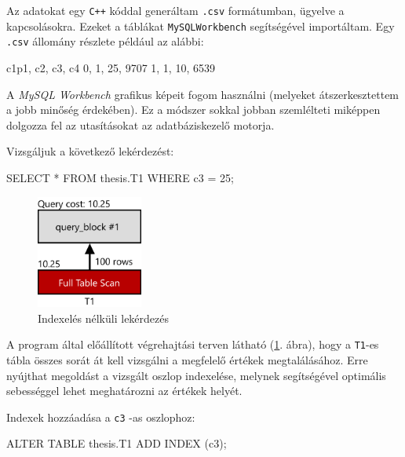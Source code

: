 


Az adatokat egy \texttt{C++} kóddal generáltam \texttt{.csv} formátumban, ügyelve a kapcsolásokra. Ezeket a táblákat \texttt{MySQLWorkbench} segítségével importáltam.
Egy \texttt{.csv} állomány részlete például az alábbi:
\begin{python}
c1p1, c2, c3, c4
0, 1, 25, 9707
1, 1, 10, 6539
\end{python}

\newpage


A \textit{MySQL Workbench} grafikus képeit fogom használni (melyeket átszerkesztettem a jobb minőség érdekében). Ez a módszer sokkal jobban szemlélteti miképpen dolgozza fel az utasításokat az adatbáziskezelő motorja.


Vizsgáljuk a következő lekérdezést:
\begin{python}
SELECT * FROM thesis.T1 WHERE c3 = 25; 
\end{python}
\begin{figure}[h!]
\centering
\includegraphics[width=3.5cm]{images/explain/1-1.png}
\caption{Indexelés nélküli lekérdezés}
\label{fig:explain_1_1}
\end{figure}

A program által előállított végrehajtási terven látható (\ref{fig:explain_1_1}. ábra), hogy a \texttt{T1}-es tábla összes sorát át kell vizsgálni a megfelelő értékek megtalálásához. Erre nyújthat megoldást a vizsgált oszlop indexelése, melynek segítségével optimális sebességgel lehet meghatározni az értékek helyét.

Indexek hozzáadása a \texttt{c3} -as oszlophoz:
\begin{python} 
ALTER TABLE thesis.T1 ADD INDEX (c3);
\end{python}


